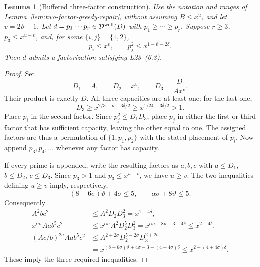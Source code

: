 \documentclass[11pt]{article}
\newtheorem{lemma}[theorem]{Lemma}
\begin{document}
\begin{lemma}[Buffered three-factor construction]
\label{lem:buffered-three-factor-greedy-repair}
Use the notation and ranges of
Lemma~\ref{lem:two-factor-greedy-repair}, without assuming
$B\le x^u$, and let $v=2\vartheta-1$.
Let $d=p_1\cdots p_r\in\mathcal D^{\rm well}(D)$ with
$p_1\ge\cdots\ge p_r$.
Suppose $r\ge3$, $p_3\le x^{u-v}$, and, for some
$\{i,j\}=\{1,2\}$,
\[
 p_i\le x^v,\qquad p_j^2\le x^{1-\vartheta-2\delta}.
\]
Then $d$ admits a factorization satisfying L23~(6.3).
\end{lemma}

\begin{proof}
Set
\[
 D_1=A,\qquad D_2=x^v,\qquad D_3=\frac{D}{Ax^v}.
\]
Their product is exactly $D$.  All three capacities are at least
one: for the last one,
\[
 D_3\ge x^{2/3-\vartheta-3\delta/2}
       \ge x^{1/24-3\delta/2}>1.
\]
Place $p_i$ in the second factor.  Since
$p_j^2\le D_1D_3$, place $p_j$ in either the first or third
factor that has sufficient capacity, leaving the other equal to
one.  The assigned factors are thus a permutation of
$\{1,p_1,p_2\}$ with the stated placement of $p_i$.
Now append $p_3,p_4,\ldots$ whenever any factor has capacity.

If every prime is appended, write the resulting factors as
$a,b,c$ with $a\le D_1$, $b\le D_2$, $c\le D_3$.
Since $p_3>1$ and $p_3\le x^{u-v}$, we have $u\ge v$.
The two inequalities defining $u\ge v$ imply, respectively,
\[
 (8-6\sigma)\vartheta+4\sigma\le5,
 \qquad \alpha\sigma+8\vartheta\le5.
\]
Consequently
\begin{align*}
 A^2bc^2
 &\le A^2D_2D_3^2
   =x^{1-4\delta},\\
 x^{\alpha\sigma}Aab^5c^2
 &\le x^{\alpha\sigma}A^2D_2^5D_3^2
   =x^{\alpha\sigma+8\vartheta-3-4\delta}
   \le x^{2-4\delta},\\
 (Ac/b)^{2\sigma}Aab^5c^2
 &\le A^{2+2\sigma}D_2^{5-2\sigma}D_3^{2+2\sigma}\\
 &=x^{(8-6\sigma)\vartheta+4\sigma-3-(4+4\sigma)\delta}
   \le x^{2-(4+4\sigma)\delta}.
\end{align*}
These imply the three required inequalities.


\end{proof}
\end{document}
